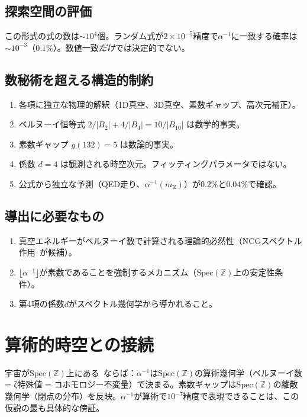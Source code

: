 \documentclass[11pt,a4paper]{article}
\newcommand{\Spec}{\mathrm{Spec}}
\begin{document}
\subsection{探索空間の評価}
この形式の式の数は$\sim 10^4$個。ランダム式が$2 \times 10^{-5}$精度で$\alpha^{-1}$に一致する確率は$\sim 10^{-3}$（$0.1\%$）。数値一致\emph{だけ}では決定的でない。

\subsection{数秘術を超える構造的制約}
\begin{enumerate}
\item 各項に独立な物理的解釈（1D真空、3D真空、素数ギャップ、高次元補正）。
\item ベルヌーイ恒等式 $2/|B_2| + 4/|B_4| = 10/|B_{10}|$ は数学的事実。
\item 素数ギャップ $g(132) = 5$ は数論的事実。
\item 係数 $d = 4$ は観測される時空次元。フィッティングパラメータではない。
\item 公式から独立な予測（QED走り、$\alpha^{-1}(m_Z)$）が$0.2\%$と$0.04\%$で確認。
\end{enumerate}

\subsection{導出に必要なもの}
\begin{enumerate}
\item 真空エネルギーがベルヌーイ数で計算される理論的必然性（NCGスペクトル作用~\cite{CCM2007}が候補）。
\item $\lfloor\alpha^{-1}\rfloor$が素数であることを強制するメカニズム（$\Spec(\mathbb{Z})$上の安定性条件）。
\item 第4項の係数$d$がスペクトル幾何学から導かれること。
\end{enumerate}

\section{算術的時空との接続}

宇宙が$\Spec(\mathbb{Z})$上にある~\cite{paper_F}ならば：$\alpha^{-1}$は$\Spec(\mathbb{Z})$の算術幾何学（ベルヌーイ数 = ζ特殊値 = コホモロジー不変量）で決まる。素数ギャップは$\Spec(\mathbb{Z})$の離散幾何学（閉点の分布）を反映。$\alpha^{-1}$が算術で$10^{-7}$精度で表現できることは、この仮説の最も具体的な傍証。
\end{document}
